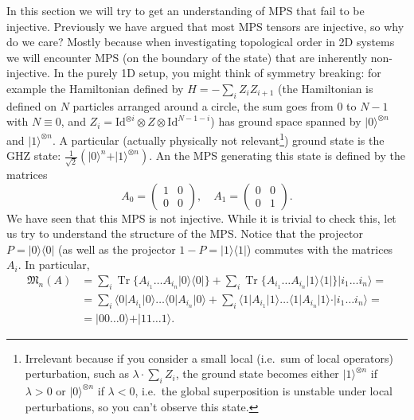 \documentclass{article}
\newcommand{\tr}{\operatorname{Tr}}
\newcommand{\id}{\mathrm{Id}}
\newcommand{\ket}[1]{\vert #1 \rangle}
\newcommand{\bra}[1]{\langle #1 \vert}
\begin{document}
In this section we will try to get an understanding of MPS that fail to be injective. Previously we have argued that most MPS tensors are injective, so why do we care? Mostly because when investigating topological order in 2D systems we will encounter MPS (on the boundary of the state) that are inherently non-injective. In the purely 1D setup, you might think of symmetry breaking: for example the Hamiltonian defined by $H = - \sum_i Z_i Z_{i+1}$ (the Hamiltonian is defined on $N$ particles arranged around a circle, the sum goes from $0$ to $N-1$ with $N\equiv 0$, and $Z_i = \id^{\otimes i}\otimes Z \otimes \id^{N-1-i}$) has 
ground space spanned by $\ket{0}^{\otimes n}$ and $\ket{1}^{\otimes n}$. A particular (actually physically not relevant\footnote{Irrelevant because if you consider a small local (i.e.\ sum of local operators) perturbation, such as $\lambda \cdot \sum_i Z_i$, the ground state becomes either $\ket{1}^{\otimes n}$ if $\lambda >0$ or $\ket{0}^{\otimes n}$ if $\lambda<0$, i.e.\ the global superposition is unstable under local perturbations, so you can't observe this state.}) ground state is the GHZ state: $\tfrac{1}{\sqrt{2}}(\ket{0}^n + \ket{1}^{\otimes n})$. An the MPS generating this state is defined by the matrices
\begin{equation*}
  A_0 = \left(\begin{matrix}
    1 & 0 \\ 0 & 0 
  \end{matrix}\right), \quad 
  A_1 = \left(\begin{matrix}
    0 & 0 \\ 0 & 1 
  \end{matrix}\right).
\end{equation*}
We have seen that this MPS is not injective. While it is trivial to check this, let us try to understand the structure of the MPS. Notice that the projector $P=\ket{0}\bra{0}$ (as well as the projector $1-P = \ket{1}\bra{1}$) commutes with the matrices $A_i$. In particular, 
\begin{align*}
  \mathfrak{M}_n(A) &= \sum_i \tr\{A_{i_1} \dots A_{i_n} \ket{0}\bra{0} \} + \sum_i \tr\{A_{i_1} \dots A_{i_n} \ket{1}\bra{1}\} \ket{i_1\dots i_n}= \\
                    &= \sum_i \bra{0}A_{i_1} \ket{0}\dots \bra{0}A_{i_n} \ket{0} + \sum_i \bra{1}A_{i_1}\ket{1} \dots \bra{1}A_{i_n} \ket{1} \cdot \ket{i_1\dots i_n} = \\
                    &= \ket{0 0\dots 0} + \ket{11\dots 1}. 
\end{align*}
\end{document}
